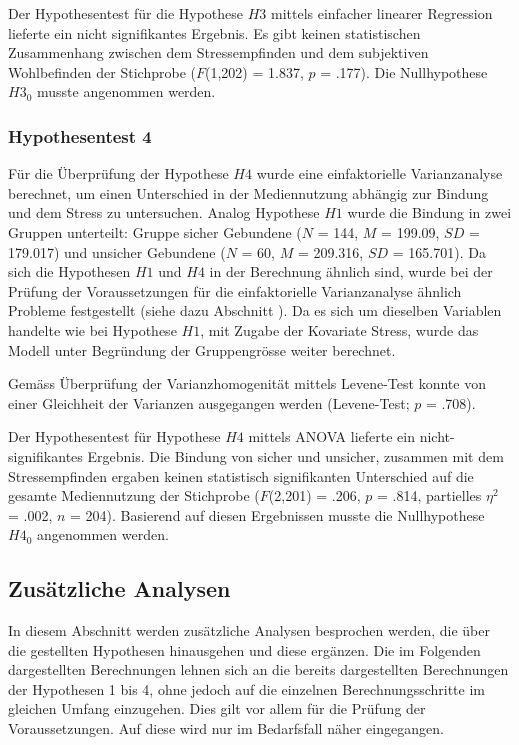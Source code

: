 Der Hypothesentest für die Hypothese $H3$ mittels einfacher linearer Regression lieferte ein nicht signifikantes Ergebnis. Es gibt keinen statistischen Zusammenhang zwischen dem Stressempfinden und dem subjektiven Wohlbefinden der Stichprobe ($F$(1,202) = 1.837, $p$ = .177).  Die Nullhypothese $H3_{0}$ musste angenommen werden.

\subsubsection{Hypothesentest 4}
Für die Überprüfung der Hypothese $H4$ wurde eine einfaktorielle Varianzanalyse berechnet, um einen Unterschied in der Mediennutzung abhängig zur Bindung und dem Stress zu untersuchen. Analog Hypothese $H1$ wurde die Bindung in zwei Gruppen unterteilt: Gruppe sicher Gebundene ($N$ = 144, $M$ = 199.09, $SD$ = 179.017) und unsicher Gebundene ($N$ = 60, $M$ = 209.316, $SD$ = 165.701). Da sich die Hypothesen $H1$ und $H4$ in der Berechnung ähnlich sind, wurde bei der Prüfung der Voraussetzungen für die einfaktorielle Varianzanalyse ähnlich Probleme festgestellt (siehe dazu Abschnitt ). Da es sich um dieselben Variablen handelte wie bei Hypothese $H1$, mit Zugabe der Kovariate Stress, wurde das Modell unter Begründung der Gruppengrösse weiter berechnet. 

Gemäss Überprüfung der Varianzhomogenität mittels Levene-Test konnte von einer Gleichheit der Varianzen ausgegangen werden (Levene-Test; $p$ = .708). 

Der Hypothesentest für Hypothese $H4$ mittels ANOVA lieferte ein nicht-signifikantes Ergebnis. Die Bindung von sicher und unsicher, zusammen mit dem Stressempfinden ergaben keinen statistisch signifikanten Unterschied auf die gesamte Mediennutzung der Stichprobe ($F$(2,201) = .206, $p$ = .814, partielles $\eta^2$ = .002, $n$ = 204). Basierend auf diesen Ergebnissen musste die Nullhypothese $H4_{0}$ angenommen werden. 

\subsection{Zusätzliche Analysen} \label{sec:ZusätzlicheAnalysen}
In diesem Abschnitt werden zusätzliche Analysen besprochen werden, die über die gestellten Hypothesen hinausgehen und diese ergänzen. Die im Folgenden dargestellten Berechnungen lehnen sich an die bereits dargestellten Berechnungen der Hypothesen 1 bis 4, ohne jedoch auf die einzelnen Berechnungsschritte im gleichen Umfang einzugehen. Dies gilt vor allem für die Prüfung der Voraussetzungen. Auf diese wird nur im Bedarfsfall näher eingegangen.

